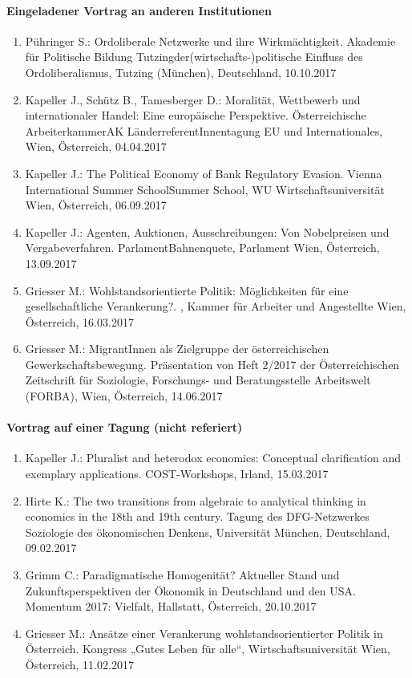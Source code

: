 \paragraph{Eingeladener Vortrag an anderen Institutionen}
\begin{enumerate}
	\item Pühringer S.: Ordoliberale Netzwerke und ihre Wirkmächtigkeit. Akademie für Politische Bildung Tutzingder(wirtschafts-)politische Einfluss des Ordoliberalismus, Tutzing (München), Deutschland, 10.10.2017
	\item Kapeller J., Schütz B., Tamesberger D.: Moralität, Wettbewerb und internationaler Handel: Eine europäische Perspektive. Österreichische ArbeiterkammerAK LänderreferentInnentagung EU und Internationales, Wien, Österreich, 04.04.2017
	\item Kapeller J.: The Political Economy of Bank Regulatory Evasion. Vienna International Summer SchoolSummer School, WU Wirtschaftsuniversität Wien, Österreich, 06.09.2017
	\item Kapeller J.: Agenten, Auktionen, Ausschreibungen: Von Nobelpreisen und Vergabeverfahren. ParlamentBahnenquete, Parlament Wien, Österreich, 13.09.2017
	\item Griesser M.: Wohlstandsorientierte Politik: Möglichkeiten für eine gesellschaftliche Verankerung?. , Kammer für Arbeiter und Angestellte Wien, Österreich, 16.03.2017
	\item Griesser M.: MigrantInnen als Zielgruppe der österreichischen Gewerkschaftsbewegung. Präsentation von Heft 2/2017 der Österreichischen Zeitschrift für Soziologie, Forschungs- und Beratungsstelle Arbeitswelt (FORBA), Wien, Österreich, 14.06.2017
\end{enumerate}
\paragraph{Vortrag auf einer Tagung (nicht referiert)}
\begin{enumerate}
	\item Kapeller J.: Pluralist and heterodox economics: Conceptual clarification and exemplary applications. COST-Workshops, Irland, 15.03.2017
	\item Hirte K.: The two transitions from algebraic to analytical thinking in economics in the 18th and 19th century. Tagung des DFG-Netzwerkes \glqq Soziologie des ökonomischen Denkens\grqq{}, Universität München, Deutschland, 09.02.2017
	\item Grimm C.: Paradigmatische Homogenität? Aktueller Stand und  Zukunftsperspektiven der Ökonomik in Deutschland und den USA. Momentum 2017: Vielfalt, Hallstatt, Österreich, 20.10.2017
	\item Griesser M.: Ansätze einer Verankerung wohlstandsorientierter Politik in Österreich. Kongress „Gutes Leben für alle“, Wirtschaftsuniversität Wien, Österreich, 11.02.2017
\end{enumerate}

